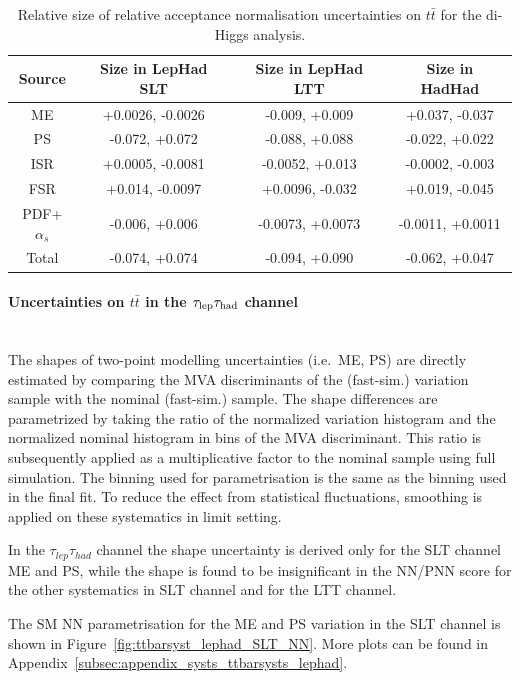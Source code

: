 \begin{table}
\centering
\small
\begin{tabular}{|c|c|c|c|}
\hline
Source & Size in LepHad SLT & Size in LepHad LTT & Size in HadHad\\
\hline
ME & +0.0026, -0.0026 & -0.009, +0.009 & +0.037, -0.037\\
PS & -0.072, +0.072 & -0.088, +0.088 & -0.022, +0.022\\
ISR & +0.0005, -0.0081 & -0.0052, +0.013 & -0.0002, -0.003\\
FSR & +0.014, -0.0097 & +0.0096, -0.032 & +0.019, -0.045\\
PDF+$\alpha_s$ & -0.006, +0.006 & -0.0073, +0.0073 & -0.0011, +0.0011\\
Total & -0.074, +0.074 & -0.094, +0.090 & -0.062, +0.047\\
\hline
\end{tabular}
\caption{Relative size of relative acceptance normalisation uncertainties on $t\bar{t}$ for the di-Higgs analysis.}
\label{sec:systs:tab:systematics_normalisations_ttbar}
\end{table}


\paragraph{Uncertainties on $t\bar{t}$ in the $\tau_{\mathrm{lep}}\tau_{\mathrm{had}}$ channel}\mbox{}\\

The shapes of two-point \ttbar modelling uncertainties (i.e.\ ME, PS) 
are directly estimated by comparing the MVA discriminants of
the (fast-sim.) variation sample with the nominal (fast-sim.) \ttbar
sample. The shape differences are parametrized by taking the ratio of
the normalized variation histogram and the normalized nominal
histogram in bins of the MVA discriminant. This ratio is subsequently
applied as a multiplicative factor to the nominal \ttbar sample using
full simulation. The binning used for parametrisation is the same 
as the binning used in the final fit. 
To reduce the effect from statistical fluctuations, smoothing is applied 
on these systematics in limit setting. 


In the $\tau_{lep}\tau_{had}$ channel the shape uncertainty is derived 
only for the SLT channel ME and PS, while the shape is found to be 
insignificant in the NN/PNN score for the
other systematics in SLT channel and for the LTT channel. 


The SM NN parametrisation for the ME and PS variation in the SLT channel is shown in 
Figure~\ref{fig:ttbarsyst_lephad_SLT_NN}.
More plots can be found in Appendix~\ref{subsec:appendix_systs_ttbarsysts_lephad}.

